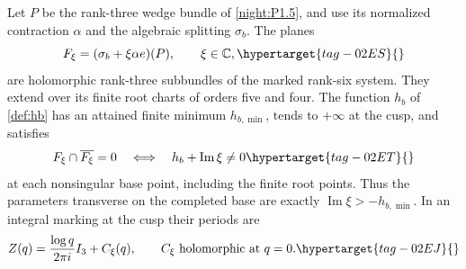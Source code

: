 \begin{theorem}
\hypertarget{tag-02O8}{}\hypertarget{tag-02QZ}{}
\label{maps:src:F.3.6}\label{night:P1.8}
Let $P$ be the rank-three wedge bundle of \cref{night:P1.5}, and use
its normalized contraction $\alpha$ and the algebraic splitting $\sigma_b$.
The planes
\begin{equation}
 F_\xi=(\sigma_b+\xi\alpha e)(P),\qquad \xi\in\mathbb C,
 \hypertarget{tag-02ES}{}\label{maps:eq:F.21}
\end{equation}
are holomorphic rank-three subbundles of the marked rank-six system.
They extend over its finite root charts of orders five and four.
The function $h_b$ of \cref{def:hb} has an attained finite minimum
$h_{b,\min}$, tends to $+\infty$ at the cusp, and satisfies
\begin{equation}
 F_\xi\cap\overline{F_\xi}=0
 \quad\Longleftrightarrow\quad
 h_b+\operatorname{Im}\xi\ne0
 \hypertarget{tag-02ET}{}\label{maps:eq:F.22}
\end{equation}
at each nonsingular base point, including the finite root points.
Thus the parameters transverse on the completed base are exactly
$\operatorname{Im}\xi>-h_{b,\min}$.
In an integral marking at the cusp their periods are
\begin{equation}
 Z(q)=\frac{\log q}{2\pi i}I_3+C_\xi(q),
 \qquad C_\xi\text{ holomorphic at }q=0.
 \hypertarget{tag-02EJ}{}\label{maps:eq:F.13}
\end{equation}
\end{theorem}
